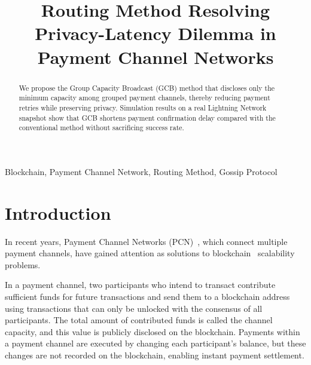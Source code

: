 \documentclass[conference]{IEEEtran}
\begin{document}
\title{Routing Method Resolving Privacy-Latency Dilemma in Payment Channel Networks}

\author{
	\and
}

\maketitle

\begin{abstract}
	We propose the Group Capacity Broadcast (GCB) method that discloses only the minimum capacity among grouped payment channels, thereby reducing payment retries while preserving privacy.
	Simulation results on a real Lightning Network snapshot show that GCB shortens payment confirmation delay compared with the conventional method without sacrificing success rate.
\end{abstract}

\begin{IEEEkeywords}
	Blockchain, Payment Channel Network, Routing Method, Gossip Protocol
\end{IEEEkeywords}

\section{Introduction}

In recent years, Payment Channel Networks (PCN)~\cite{poon_dryja_2016}, which connect multiple payment channels, have gained attention as solutions to blockchain~\cite{nakamoto2008bitcoin} scalability problems.

In a payment channel, two participants who intend to transact contribute sufficient funds for future transactions and send them to a blockchain address using transactions that can only be unlocked with the consensus of all participants.
The total amount of contributed funds is called the channel capacity, and this value is publicly disclosed on the blockchain.
Payments within a payment channel are executed by changing each participant's balance, but these changes are not recorded on the blockchain, enabling instant payment settlement.
\end{document}
